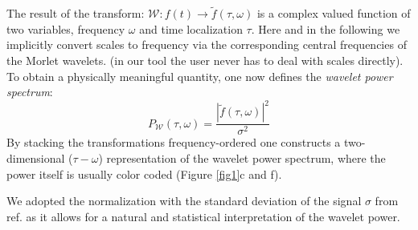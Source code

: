 The result of the transform: $\mathcal{W}: f(t) \rightarrow \widetilde{f}(\tau,\omega)$ is a complex valued function of two variables, frequency $\omega$ and time localization $\tau$. Here and in the following we implicitly convert scales to frequency via the corresponding central frequencies of the Morlet wavelets. (in our tool the user never has to deal with scales directly). To obtain a physically meaningful quantity, one now defines the \textit{wavelet power spectrum}:
\begin{equation}
P_\mathcal{W}(\tau, \omega) = \frac{|\widetilde{f}(\tau, \omega)|^2}{\sigma^2}
\end{equation}
By stacking the transformations frequency-ordered one constructs a two-dimensional ($\tau-\omega$) representation of the wavelet power spectrum, where the power itself is usually color coded (Figure \ref{fig1}c and f).


We adopted the normalization with the standard deviation of the signal $\sigma$ from ref. \cite{Torrence1998} as it allows for a natural and statistical interpretation of the wavelet power.

